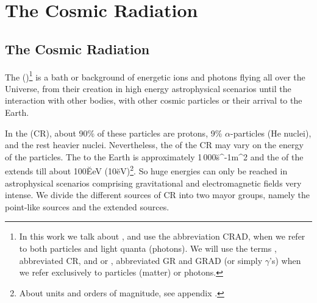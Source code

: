 

\chapter{The Cosmic Radiation}
\label{chapter:cosmicrad}
\let\rightmark\leftmark

\section{The Cosmic Radiation}

The \emph{} ()\footnote{In this work we
  talk about \emph{}, and use the abbreviation
  CRAD, when we refer to both particles and light quanta (photons). We
  will use the terms \emph{}, abbreviated CR, and
  \emph{} or \emph{}, abbreviated GR
  and GRAD (or simply $\gamma$'s) when we refer exclusively to
  particles (matter) or photons.}  is a bath or background of
energetic ions and photons flying all over the Universe, from their
creation in high energy astrophysical scenarios until the interaction
with other bodies, with other cosmic particles or their arrival to the
Earth.

In the \emph{} (CR), about 90\% of these particles are
protons, 9\% $\alpha$-particles (He nuclei), and the rest heavier
nuclei. Nevertheless, the  
of the CR may vary on the energy of the particles. The  to the Earth is approximately 1\,000\u{s^{-1}m^2} and the
 of the \emph{} extends till about
100\u{EeV} (10\u{eV})\footnote{About units and orders of
  magnitude, see appendix .}. So huge energies
can only be reached in astrophysical scenarios comprising
gravitational and electromagnetic fields very intense. We divide the
different sources of CR into two mayor groups, namely the point-like
sources and the extended sources.


\MORE%

